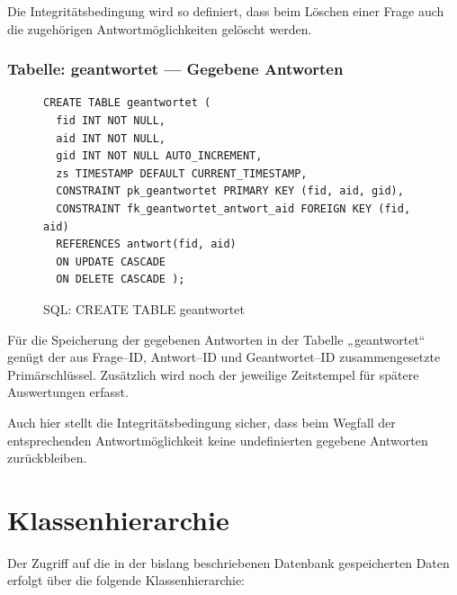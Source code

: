 Die Integritätsbedingung wird so definiert, dass beim Löschen einer Frage auch die zugehörigen Antwortmöglichkeiten gelöscht werden.

\subsubsection{Tabelle: geantwortet --- Gegebene Antworten}
\begin{figure}[H]
\begin{verbatim}
CREATE TABLE geantwortet (
  fid INT NOT NULL,
  aid INT NOT NULL,
  gid INT NOT NULL AUTO_INCREMENT,
  zs TIMESTAMP DEFAULT CURRENT_TIMESTAMP,
  CONSTRAINT pk_geantwortet PRIMARY KEY (fid, aid, gid),
  CONSTRAINT fk_geantwortet_antwort_aid FOREIGN KEY (fid, aid) 
  REFERENCES antwort(fid, aid) 
  ON UPDATE CASCADE 
  ON DELETE CASCADE );
\end{verbatim}
\caption{SQL: CREATE TABLE geantwortet}
\label{sql:tblgeantwortet}
\end{figure}

Für die Speicherung der gegebenen Antworten in der Tabelle „geantwortet“ genügt der aus Frage--ID, Antwort--ID und Geantwortet--ID zusammengesetzte Primärschlüssel. Zusätzlich wird noch der jeweilige Zeitstempel für spätere Auswertungen erfasst.

Auch hier stellt die Integritätsbedingung sicher, dass beim Wegfall der entsprechenden Antwortmöglichkeit keine undefinierten gegebene Antworten zurückbleiben.

\section{Klassenhierarchie}

Der Zugriff auf die in der bislang beschriebenen Datenbank gespeicherten Daten erfolgt über die folgende  Klassenhierarchie:

